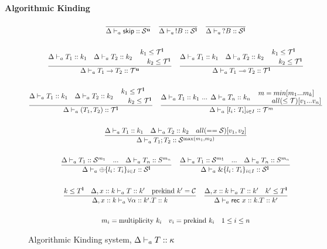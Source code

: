 \documentclass[12pt,openright,twoside]{report}
\begin{document}
	\begin{center}
		\textbf{Algorithmic Kinding}
	\end{center}

\begin{figure}[ht]
\centering
  \begin{gather*}
	\frac{}{\Delta \Alg \skipk :: \kinds^\Unrestricted} \quad
	\frac{}{\Delta \Alg \,!B :: \kinds^\Linear} \quad \frac{}{\Delta
			\Alg \,?B :: \kinds^\Linear}
    \\\\
    \frac{\Delta \Alg T_1 :: k_1 \quad \Delta \Alg T_2 :: k_2 \quad \splitdfrac{k_1 \le \kindt^\Linear}{k_2 \le \kindt^\Linear}}
    	{\Delta \Alg T_1 \to T_2 :: \kindt^\Unrestricted}	
	\quad
    \frac{\Delta \Alg T_1 :: k_1 \quad \Delta \Alg T_2 :: k_2 \quad \splitdfrac{k_1 \le \kindt^\Linear}{k_2 \le \kindt^\Linear}}
    	{\Delta \Alg T_1 \multimap T_2 :: \kindt^\Linear}	
    \\\\
    \frac{\Delta \Alg T_1 :: k_1 \quad \Delta \Alg T_2 :: k_2 \quad \splitdfrac{k_1 \le \kindt^\Linear}{k_2 \le \kindt^\Linear}}
    	{\Delta \Alg (T_1,T_2) :: \kindt^\Linear}	
	\quad
    \frac{\Delta \Alg T_1 :: k_1 \mbox{ ... } \Delta \Alg T_n :: k_n \quad 
    	\splitfrac{m=min[m_1 ... m_k]}{all(\le \kindt)[v_1 ... v_n]}}
    	{\Delta \Alg [l_i\colon T_i]_{i\in I} :: \kindt^m}	
	\\\\
	\frac{\Delta \Alg T_1 :: k_1 \quad \Delta \Alg T_2 :: k_2 \quad all(== \kinds)[v_1,v_2]}
    	{\Delta \Alg T_1;T_2 :: \kinds^{\max(m_1, m_2)}}	    
	\\\\
		\frac{\Delta \Alg T_1 :: \kinds^{m_1} \quad \mbox{...} \quad \Delta \Alg T_n :: S^{m_n}}{
      \Delta \Alg \oplus\{l_i\colon T_i\}_{i\in I} :: \kinds^\Linear}
    \quad
    \frac{\Delta \Alg T_1 :: \kinds^{m_1} \quad \mbox{...} \quad \Delta \Alg T_n :: S^{m_n}}
    { \Delta \Alg \&\{l_i\colon T_i\}_{i\in I} :: \kinds^\Linear}
	\\\\
	 \frac{k \le T^\Linear \quad \Delta, x :: k \Alg T :: k' \quad \mbox{prekind } k' = \kindsch}
    { \Delta, x :: k \Alg \forall \alpha :: k'.T :: k}
	\quad
	\frac{\Delta, x :: k \Alg T :: k' \quad k' \le T^{\Linear}}
	    { \Delta \Alg \recc \mbox{ } x :: k.T :: k'}
	 \\\\
	m_i = \mbox{multiplicity } k_i \quad v_i = \mbox{prekind } k_i \quad 1 \le i \le n 
	\end{gather*}
  \caption{Algorithmic Kinding system, $\Delta \vdash_{a} T :: \kappa$}
  \label{fig:kinding}
\end{figure}
 
%



\end{document}
